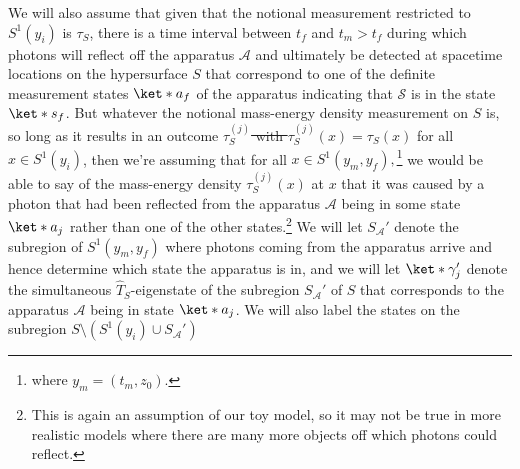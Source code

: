 \documentclass[12pt]{report}
\providecommand{\DIFadd}[1]{{\protect\color{blue}\uwave{#1}}} %
\providecommand{\DIFdel}[1]{{\protect\color{red}\sout{#1}}}                      %
\providecommand{\DIFaddbegin}{} %
\providecommand{\DIFaddend}{} %
\providecommand{\DIFdelbegin}{} %
\providecommand{\DIFdelend}{} %
\begin{document}
We will also assume that given that the notional measurement restricted to $S^1(y_i)$ is $\tau_S$, there is a time interval between $t_f$ and $t_m > t_f$  %
%
 during which photons will reflect off the apparatus $\mathcal{A}$ and ultimately be detected at spacetime locations on the hypersurface $S$ that correspond to one of the definite measurement states $\ket*{a_f}$ %
%
 of the apparatus indicating that $\mathcal{S}$ is in the state $\ket*{s_f}$. %
 But whatever the  notional mass-energy density measurement on $S$ is, so long as it results in an outcome \DIFdelbegin \DIFdel{$\tau_S^{(j)}$ with $\tau_S^{(j)}(x)=\tau_S(x)$ }\DIFdelend \DIFaddbegin \DIFadd{$\tau_{S,j}$ with $\tau_{S,j}(x)=\tau_S(x)$ }\DIFaddend for all $x\in S^1(y_i)$, then we're assuming that for all $x \in S^1(y_m,y_f),$\footnote{where $y_m=(t_m, z_0)$.} we would be able to say of the mass-energy density \DIFdelbegin \DIFdel{$\tau_S^{(j)}(x)$ }\DIFdelend \DIFaddbegin \DIFadd{$\tau_{S,j}(x)$ }\DIFaddend at $x$ that it was caused by a photon that had been reflected from the apparatus $\mathcal{A}$ being in some state $\ket*{a_j}$ rather than one of the other states.\footnote{This is again an assumption of our toy model, so it may not be true in more realistic models where there are many more objects off which photons could reflect.} We will let $S_{\mathcal{A}}'$ %
  denote the subregion of $S^1(y_m,y_f)$ where photons coming from the apparatus arrive and hence determine which state the apparatus  is in, and we will let $\ket*{\gamma'_j}$ %
   denote the simultaneous $\hat{T}_S$-eigenstate of the subregion $S_{\mathcal{A}}'$ of $S$ that corresponds to the apparatus $\mathcal{A}$ being in state $\ket*{a_j}$.  We will also label the states on the subregion $S\setminus (S^1(y_i)\cup S_{\mathcal{A}}')$ %
\end{document}
